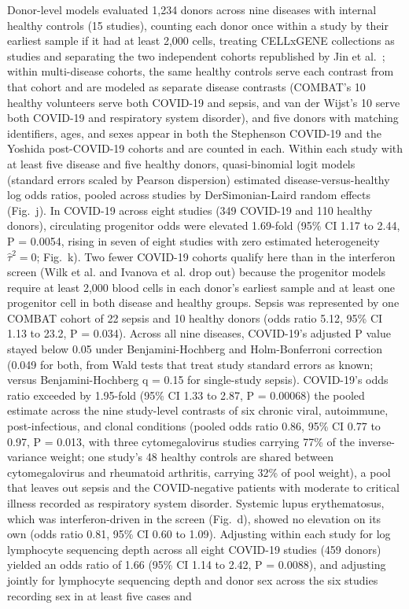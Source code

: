 \label{note:Progenitor disease and severity models}

Donor-level models evaluated 1,234 donors across nine diseases with internal healthy controls (15 studies), counting each donor once within a study by their earliest sample if it had at least 2,000 cells, treating CELLxGENE collections as studies and separating the two independent cohorts republished by Jin et al.~\cite{jin2021interactive}; within multi-disease cohorts, the same healthy controls serve each contrast from that cohort and are modeled as separate disease contrasts (COMBAT's 10 healthy volunteers serve both COVID-19 and sepsis, and van der Wijst's 10 serve both COVID-19 and respiratory system disorder), and five donors with matching identifiers, ages, and sexes appear in both the Stephenson COVID-19 and the Yoshida post-COVID-19 cohorts and are counted in each. Within each study with at least five disease and five healthy donors, quasi-binomial logit models (standard errors scaled by Pearson dispersion) estimated disease-versus-healthy log odds ratios, pooled across studies by DerSimonian-Laird random effects~\cite{dersimonian1986metaanalysis} (Fig.~j). In COVID-19 across eight studies (349 COVID-19 and 110 healthy donors), circulating progenitor odds were elevated 1.69-fold (95\% CI 1.17 to 2.44, P = 0.0054, rising in seven of eight studies with zero estimated heterogeneity $\hat\tau^{2}=0$; Fig.~k). Two fewer COVID-19 cohorts qualify here than in the interferon screen (Wilk et al. and Ivanova et al. drop out) because the progenitor models require at least 2,000 blood cells in each donor's earliest sample and at least one progenitor cell in both disease and healthy groups. Sepsis was represented by one COMBAT cohort of 22 sepsis and 10 healthy donors (odds ratio 5.12, 95\% CI 1.13 to 23.2, P = 0.034). Across all nine diseases, COVID-19's adjusted P value stayed below 0.05 under Benjamini-Hochberg and Holm-Bonferroni correction (0.049 for both, from Wald tests that treat study standard errors as known; versus Benjamini-Hochberg q = 0.15 for single-study sepsis). COVID-19's odds ratio exceeded by 1.95-fold (95\% CI 1.33 to 2.87, P = 0.00068) the pooled estimate across the nine study-level contrasts of six chronic viral, autoimmune, post-infectious, and clonal conditions (pooled odds ratio 0.86, 95\% CI 0.77 to 0.97, P = 0.013, with three cytomegalovirus studies carrying 77\% of the inverse-variance weight; one study's 48 healthy controls are shared between cytomegalovirus and rheumatoid arthritis, carrying 32\% of pool weight), a pool that leaves out sepsis and the COVID-negative patients with moderate to critical illness recorded as respiratory system disorder. Systemic lupus erythematosus, which was interferon-driven in the screen (Fig.~d), showed no elevation on its own (odds ratio 0.81, 95\% CI 0.60 to 1.09). Adjusting within each study for log lymphocyte sequencing depth across all eight COVID-19 studies (459 donors) yielded an odds ratio of 1.66 (95\% CI 1.14 to 2.42, P = 0.0088), and adjusting jointly for lymphocyte sequencing depth and donor sex across the six studies recording sex in at least five cases and 
